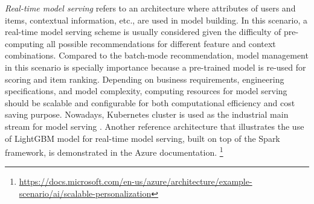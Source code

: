 \textit{Real-time model serving} refers to an architecture where attributes of users and items, contextual information, etc., are used in model building. In this scenario, a real-time model serving scheme is usually considered given the difficulty of pre-computing all possible recommendations for different feature and context combinations. Compared to the batch-mode recommendation, model management in this scenario is specially importance because a pre-trained model is re-used for scoring and item ranking. Depending on business requirements, engineering specifications, and model complexity, computing resources for model serving should be scalable and configurable for both computational efficiency and cost saving purpose. Nowadays, Kubernetes cluster is used as the industrial main stream for model serving \cite{bernstein2014containers}. Another reference architecture that illustrates the use of LightGBM model \cite{ke2017lightgbm} for real-time model serving, built on top of the Spark framework, is demonstrated in the Azure documentation. \footnote{\url{https://docs.microsoft.com/en-us/azure/architecture/example-scenario/ai/scalable-personalization}}
